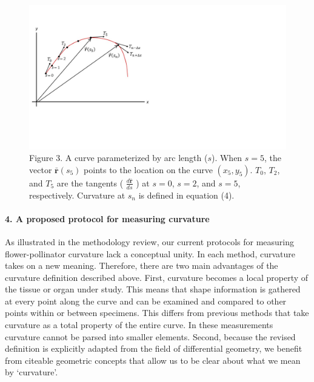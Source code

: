 \documentclass[]{article}
\let\oldparagraph\paragraph
\renewcommand{\paragraph}[1]{\oldparagraph{#1}\mbox{}}
\begin{document}
\begin{figure}
\centering
\includegraphics{Figures/Figure_3.jpg}
\caption{Figure 3. A curve parameterized by arc length (\(s\)). When
\(s=5\), the vector \(\mathbf{\bar{r}}(s_5)\) points to the location on
the curve \((x_5, y_5)\). \(T_0\), \(T_2\), and \(T_5\) are the tangents
( \(\frac{d \mathbf{\bar{r}}}{ds}\) ) at \(s=0\), \(s=2\), and \(s=5\),
respectively. Curvature at \(s_n\) is defined in equation (4).}
\end{figure}

\hypertarget{a-proposed-protocol-for-measuring-curvature}{%
\paragraph{4. A proposed protocol for measuring
curvature}\label{a-proposed-protocol-for-measuring-curvature}}

As illustrated in the methodology review, our current protocols for
measuring flower-pollinator curvature lack a conceptual unity. In each
method, curvature takes on a new meaning. Therefore, there are two main
advantages of the curvature definition described above. First, curvature
becomes a local property of the tissue or organ under study. This means
that shape information is gathered at every point along the curve and
can be examined and compared to other points within or between
specimens. This differs from previous methods that take curvature as a
total property of the entire curve. In these measurements curvature
cannot be parsed into smaller elements. Second, because the revised
definition is explicitly adapted from the field of differential
geometry, we benefit from citeable geometric concepts that allow us to
be clear about what we mean by `curvature'.
\end{document}
